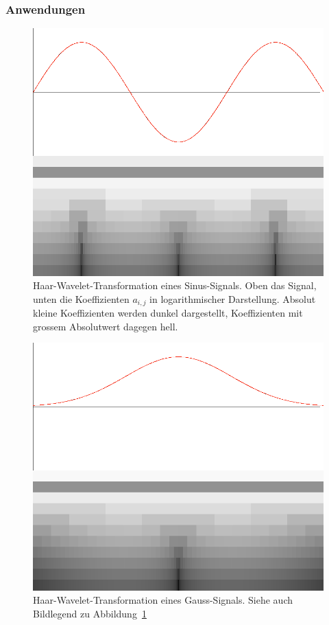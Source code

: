 \subsubsection{Anwendungen}
\begin{figure}
\begin{center}
\includegraphics[width=\hsize]{applications/wavelet-sin3}
\end{center}
\caption{Haar-Wavelet-Transformation eines Sinus-Signals. Oben das Signal,
unten die Koeffizienten $a_{i,j}$ in logarithmischer Darstellung.
Absolut kleine Koeffizienten werden dunkel dargestellt, Koeffizienten
mit grossem Absolutwert dagegen hell.\label{wavelet-sin}}
\end{figure}
\begin{figure}
\begin{center}
\includegraphics[width=\hsize]{applications/wavelet-normal}
\end{center}
\caption{Haar-Wavelet-Transformation eines Gauss-Signals. Siehe 
auch Bildlegend zu Abbildung~\ref{wavelet-sin}\label{wavelet-normal}}
\end{figure}

